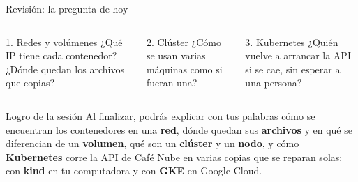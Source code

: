 \documentclass[aspectratio=169,10pt,c]{beamer}
\begin{document}
\begin{frame}{Revisión: la pregunta de hoy}
\begin{center}
\end{center}
\vspace{3mm}
\begin{columns}[T,onlytextwidth]
\begin{block}{1. Redes y volúmenes}
\small ¿Qué IP tiene cada contenedor? ¿Dónde quedan los archivos que copias?
\end{block}
\begin{block}{2. Clúster}
\small ¿Cómo se usan varias máquinas como si fueran una?
\end{block}
\begin{block}{3. Kubernetes}
\small ¿Quién vuelve a arrancar la API si se cae, sin esperar a una persona?
\end{block}
\end{columns}
\end{frame}

\begin{frame}[c]
\begin{block}{Logro de la sesión}
Al finalizar, podrás explicar con tus palabras cómo se encuentran los contenedores en una \textbf{red}, dónde quedan sus \textbf{archivos} y en qué se diferencian de un \textbf{volumen}, qué son un \textbf{clúster} y un \textbf{nodo}, y cómo \textbf{Kubernetes} corre la API de Café Nube en varias copias que se reparan solas: con \textbf{kind} en tu computadora y con \textbf{GKE} en Google Cloud.
\end{block}
\end{frame}
\end{document}
